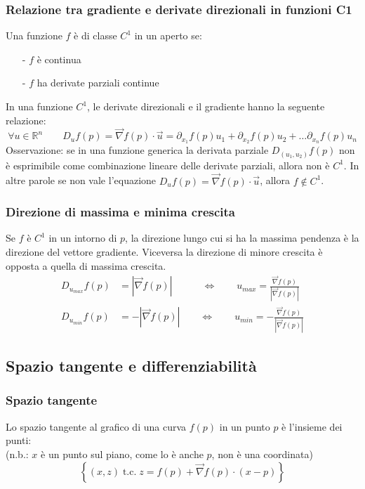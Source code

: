 \documentclass[a4paper]{article}
\newcommand\Rn{\mathbb{R}^n}  %
\newcommand\tc{\text{t.c.}}   %
\newcommand\nab{\vec{\nabla}} %
\begin{document}
\subsubsection*{Relazione tra gradiente e derivate direzionali in funzioni C1}
Una funzione \(f\) è di classe \(C^1\) in un aperto se:
\begin{itemize}[topsep=3pt, itemsep=0pt]
	\item[-] \(f\) è continua
	\item[-] \(f\) ha derivate parziali continue
\end{itemize}
In una funzione \(C^1\), le derivate direzionali e il gradiente hanno la seguente relazione:
\[\forall u \in \Rn \qquad D_u f(p) = \nab f(p) \cdot \vec{u} = \partial_{x_1} f(p) u_1 + \partial_{x_2} f(p) u_2 + \dots \partial_{x_n} f(p) u_n\]
Osservazione: se in una funzione generica la derivata parziale \(D_{(u_1, u_2)} f(p)\) non è esprimibile come combinazione
lineare delle derivate parziali, allora non è \(C^1\). In altre parole se non vale l'equazione \(D_u f(p) = \nab f(p) \cdot \vec{u}\), allora \(f \notin C^1\).

\subsubsection*{Direzione di massima e minima crescita}
Se \(f\) è \(C^1\) in un intorno di \(p\), la direzione lungo cui si ha la massima pendenza è la direzione del vettore gradiente.
Viceversa la direzione di minore crescita è opposta a quella di massima crescita.
\begin{align*}
	D_{u_{max}} f(p) &= \left| \nab f(p)\right| \qquad \quad \Leftrightarrow \qquad u_{max} = \frac{\nab f(p)}{\left| \nab f(p) \right|} \\
	D_{u_{min}} f(p) &= -\left| \nab f(p)\right| \qquad \Leftrightarrow \qquad u_{min} = -\frac{\nab f(p)}{\left| \nab f(p) \right|}
\end{align*}

\subsection{Spazio tangente e differenziabilità}
\subsubsection*{Spazio tangente}
Lo spazio tangente al grafico di una curva \(f(p)\) in un punto \(p\) è l'insieme dei punti: \\
(n.b.: \(x\) è un punto sul piano, come lo è anche \(p\), non è una coordinata)
\[\left\{ (x,z) \; \tc \; z = f(p) + \nab f(p) \cdot (x-p)\right\}\] 
\end{document}
